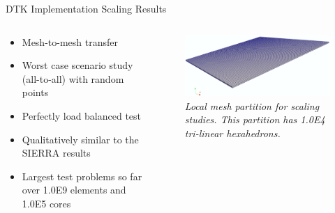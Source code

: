 \documentclass{beamer}
\begin{document}
\begin{frame}{DTK Implementation Scaling Results}

  \begin{columns}
    
    \begin{column}{0.5\textwidth}
      \begin{itemize}
      \item Mesh-to-mesh transfer
        \bigskip
      \item Worst case scenario study (all-to-all) with random points
        \bigskip
      \item Perfectly load balanced test
        \bigskip
      \item Qualitatively similar to the SIERRA results
        \bigskip
      \item Largest test problems so far over 1.0E9 elements and 1.0E5
        cores
      \end{itemize}
    \end{column}

    \begin{column}{0.5\textwidth}
      \begin{figure}
      \centering
      \includegraphics[width=2.4in]{mesh.png}
      \caption{\sl Local mesh partition for scaling studies. This
        partition has 1.0E4 tri-linear hexahedrons.}
      \end{figure}
    \end{column}

  \end{columns}

\end{frame}
\end{document}
